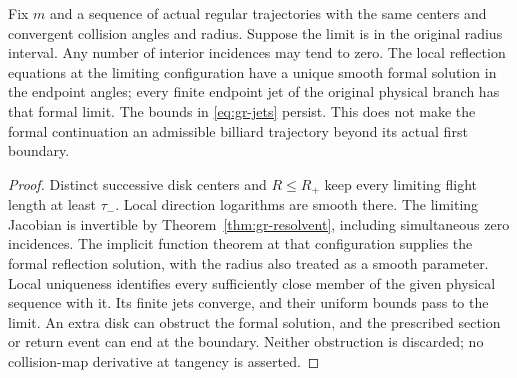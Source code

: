 \begin{corollary}
\label{cor:gr-grazing-limit}
Fix $m$ and a sequence of actual regular trajectories with the same
centers and convergent collision angles and radius. Suppose the limit
is in the original radius interval. Any number of interior incidences
may tend to zero. The local reflection equations at the limiting
configuration have a unique smooth formal solution in the endpoint
angles; every finite endpoint jet of the original physical branch has
that formal limit. The bounds in \eqref{eq:gr-jets} persist.
This does not make the formal continuation an admissible billiard
trajectory beyond its actual first boundary.
\end{corollary}
\begin{proof}
Distinct successive disk centers and $R\le R_+$ keep every limiting
flight length at least $\tau_-$. Local direction logarithms are smooth
there. The limiting Jacobian is invertible by
Theorem~\ref{thm:gr-resolvent}, including simultaneous zero incidences.
The implicit function theorem at that configuration supplies the
formal reflection solution, with the radius also treated as a smooth
parameter. Local uniqueness identifies every
sufficiently close member of the given physical sequence with it.
Its finite jets converge, and their uniform bounds pass to the limit.
An extra disk can obstruct the formal solution, and the prescribed
section or return event can end at the boundary. Neither obstruction
is discarded; no collision-map derivative at tangency is asserted.
\end{proof}
